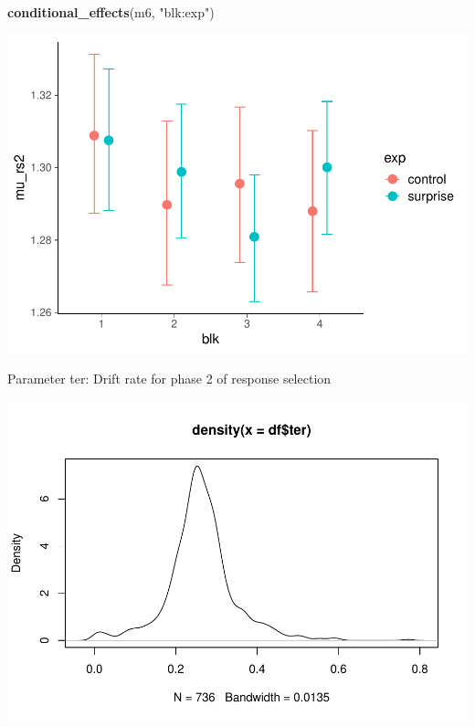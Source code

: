 \documentclass[
]{article}
\newenvironment{Shaded}{\begin{snugshade}}{\end{snugshade}}
\newcommand{\FunctionTok}[1]{\textcolor[rgb]{0.13,0.29,0.53}{\textbf{#1}}}
\newcommand{\NormalTok}[1]{#1}
\newcommand{\SpecialCharTok}[1]{\textcolor[rgb]{0.81,0.36,0.00}{\textbf{#1}}}
\newcommand{\StringTok}[1]{\textcolor[rgb]{0.31,0.60,0.02}{#1}}
\begin{document}
\begin{Shaded}
\begin{Highlighting}[]
\FunctionTok{conditional\_effects}\NormalTok{(m6, }\StringTok{"blk:exp"}\NormalTok{)}
\end{Highlighting}
\end{Shaded}

\includegraphics{params_analyses_files/figure-latex/unnamed-chunk-7-3.pdf}

Parameter ter: Drift rate for phase 2 of response selection

\begin{Shaded}
\end{Shaded}

\includegraphics{params_analyses_files/figure-latex/unnamed-chunk-8-1.pdf}
\end{document}
